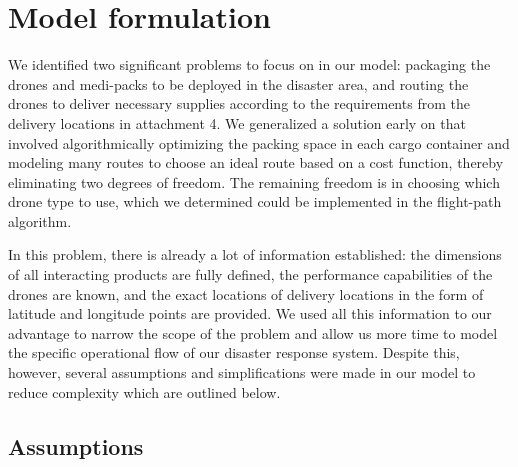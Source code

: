 \documentclass[twocolumn,10pt]{asme2ej}
\begin{document}
\section{Model formulation}
We identified two significant problems to focus on in our model: packaging the drones and medi-packs to be deployed in the disaster area, and routing the drones to deliver necessary supplies according to the requirements from the delivery locations in attachment 4. We generalized a solution early on that involved algorithmically optimizing the packing space in each cargo container and modeling many routes to choose an ideal route based on a cost function, thereby eliminating two degrees of freedom. The remaining freedom is in choosing which drone type to use, which we determined could be implemented in the flight-path algorithm.

In this problem, there is already a lot of information established: the dimensions of all interacting products are fully defined, the performance capabilities of the drones are known, and the exact locations of delivery locations in the form of latitude and longitude points are provided. We used all this information to our advantage to narrow the scope of the problem and allow us more time to model the specific operational flow of our disaster response system. Despite this, however, several assumptions and simplifications were made in our model to reduce complexity which are outlined below.

\subsection{Assumptions}
\end{document}
